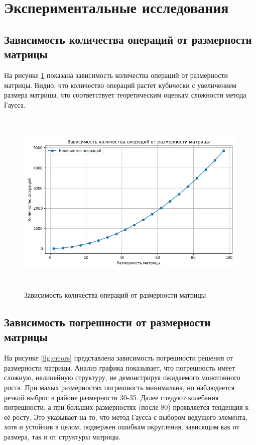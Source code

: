 \section{Экспериментальные исследования}

\subsection*{Зависимость количества операций от размерности матрицы}
На рисунке \ref{fig:iterations} показана зависимость количества операций от размерности матрицы. Видно, что количество операций растет кубически с увеличением размера матрицы, что соответствует теоретическим оценкам сложности метода Гаусса.

\begin{figure}
  \centering
  \includegraphics[width=\textwidth, height=9cm]{figures/1.png}
  \caption{Зависимость количества операций от размерности матрицы}
  \label{fig:iterations}
\end{figure}

\subsection*{Зависимость погрешности от размерности матрицы}

На рисунке \ref{fig:errors} представлена зависимость погрешности решения от размерности матрицы. Анализ графика показывает, что погрешность имеет сложную, нелинейную структуру, не демонстрируя ожидаемого монотонного роста. При малых размерностях погрешность минимальна, но наблюдается резкий выброс в районе размерности 30-35. Далее следуют колебания погрешности, а при больших размерностях (после 80) проявляется тенденция к её росту. Это указывает на то, что метод Гаусса с выбором ведущего элемента, хотя и устойчив в целом, подвержен ошибкам округления, зависящим как от размера, так и от структуры матрицы.


